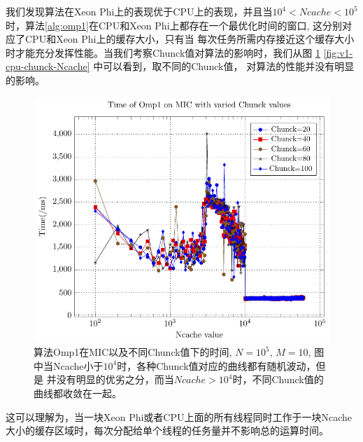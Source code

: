 我们发现算法在Xeon Phi上的表现优于CPU上的表现，并且当$10^4 < Ncache < 10^5$时，算法\ref{alg:omp1}在CPU和Xeon Phi上都存在一个最优化时间的窗口, 
这分别对应了CPU和Xeon Phi上的缓存大小，只有当
每次任务所需内存接近这个缓存大小时才能充分发挥性能。当我们考察Chunck值对算法的影响时，我们从图
\ref{fig:v1-mic-chunck-Ncache} \ref{fig:v1-cpu-chunck-Ncache} 中可以看到，取不同的Chunck值，
对算法的性能并没有明显的影响。
\begin{figure}[!t]
   \centering
   \includegraphics[width=\textwidth]{chap5/Figures/bsV1-mic-Time-Chunck.pdf}
   \caption{算法Omp1在MIC以及不同Chunck值下的时间, $N=10^5$, $M=10$, 图中当Ncache小于$10^4$时，各种Chunck值对应的曲线都有随机波动，但是
   并没有明显的优劣之分，而当$Ncache > 10^4$时，不同Chunck值的曲线都收敛在一起。}
   \label{fig:v1-mic-chunck-Ncache}
\end{figure}
这可以理解为，当一块Xeon Phi或者CPU上面的所有线程同时工作于一块Ncache大小的缓存区域时，每次分配给单个线程的任务量并不影响总的运算时间。
